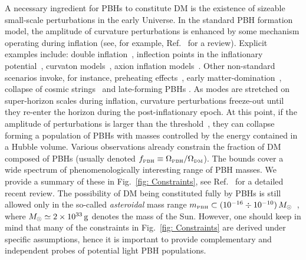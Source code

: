 \documentclass[11pt,a4paper]{article}
\begin{document}
 A necessary ingredient for PBHs to constitute DM is the existence of sizeable small-scale perturbations in the early Universe.
In the standard PBH formation model, the amplitude of curvature perturbations is enhanced by some mechanism operating during inflation (see, for example, Ref.~\cite{Sasaki:2018dmp} for a review). 
Explicit examples include: 
double inflation~\cite{Silk:1986vc, Kawasaki:1997ju, Kannike:2017bxn,Ashoorioon:2020hln}, inflection points in the inflationary potential~\cite{Garcia-Bellido:1996mdl, Alabidi:2009bk, Clesse:2015wea, Garcia-Bellido:2017mdw, Ballesteros:2017fsr, Hertzberg:2017dkh, Motohashi:2017kbs, Ballesteros:2020qam}, 
curvaton models~\cite{Kawasaki:2012wr, Carr:2017edp}, 
axion inflation models~\cite{Garcia-Bellido:2016dkw, Domcke:2017fix,Ozsoy:2018flq}. 
Other non-standard scenarios invoke, for instance, 
preheating effects~\cite{Green:2000he, Bassett:2000ha, Martin:2019nuw, Muia:2019coe, Cotner:2019ykd, Nazari:2020fmk}, 
early matter-domination~\cite{Green:1997pr, Harada:2016mhb, Krippendorf:2018tei, deJong:2021bbo, Padilla:2021zgm, DeLuca:2021pls, Das:2021wad}, collapse of cosmic strings~\cite{Polnarev:1988dh, Garriga:1993gj, Caldwell:1995fu, MacGibbon:1997pu, Helfer:2018qgv, Jenkins:2020ctp}
and late-forming PBHs \cite{Chakraborty:2022mwu}. 
As modes are stretched on super-horizon scales during inflation, curvature perturbations 
freeze-out until they re-enter the horizon during the post-inflationary epoch. At this point, if the amplitude of perturbations is larger than the threshold~\cite{Musco:2004ak, Polnarev:2006aa, Musco:2008hv, Musco:2012au, Musco:2018rwt, Kehagias:2019eil, Musco:2020jjb, Musco:2021sva}, they can collapse forming a population of PBHs with masses controlled by the energy contained in a Hubble volume. 
Various observations already constrain the fraction of DM composed of PBHs (usually denoted $f_{\text{\tiny PBH}} \equiv \Omega_\text{\tiny PBH}/\Omega_\text{\tiny DM}$). The bounds cover a wide spectrum of phenomenologically interesting range of PBH masses. We provide a summary of these in Fig.~\ref{fig: Constraints}, see  Ref.~\cite{Carr:2020gox} for a detailed recent review. 
The possibility of DM being constituted fully by PBHs is still allowed only in the so-called \textit{asteroidal} mass range $m_\text{\tiny PBH} \subset(10^{-16}\div 10^{-10}) \, M_\odot$~\cite{Katz:2018zrn, Montero-Camacho:2019jte},
where $M_{\odot} \simeq 2 \times 10^{33} \, {\rm g}$ denotes the mass of the Sun.
However, one should  keep in mind that many of the constraints in Fig.~\ref{fig: Constraints} are derived under specific assumptions, hence it is important to provide complementary and independent probes of potential light PBH populations.
\end{document}

